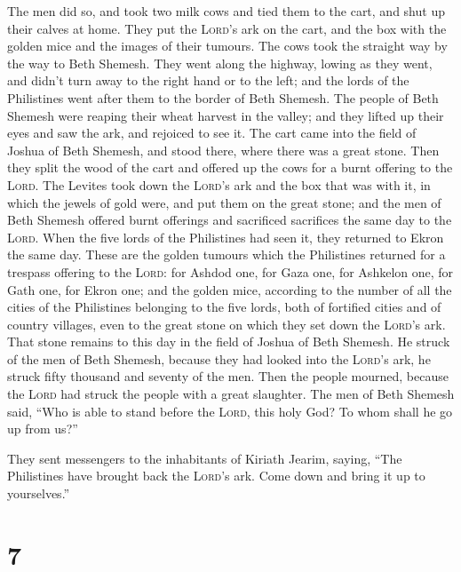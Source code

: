  The men did so, and took two milk cows and tied them to
the cart, and shut up their calves at home.  They put the
\textsc{Lord}'s ark on the cart, and the box with the golden mice and
the images of their tumours.  The cows took the straight
way by the way to Beth Shemesh. They went along the highway, lowing as
they went, and didn't turn away to the right hand or to the left; and
the lords of the Philistines went after them to the border of Beth
Shemesh.  The people of Beth Shemesh were reaping their
wheat harvest in the valley; and they lifted up their eyes and saw the
ark, and rejoiced to see it.  The cart came into the
field of Joshua of Beth Shemesh, and stood there, where there was a
great stone. Then they split the wood of the cart and offered up the
cows for a burnt offering to the \textsc{Lord}.  The
Levites took down the \textsc{Lord}'s ark and the box that was with it,
in which the jewels of gold were, and put them on the great stone; and
the men of Beth Shemesh offered burnt offerings and sacrificed
sacrifices the same day to the \textsc{Lord}.  When the
five lords of the Philistines had seen it, they returned to Ekron the
same day.  These are the golden tumours which the
Philistines returned for a trespass offering to the \textsc{Lord}: for
Ashdod one, for Gaza one, for Ashkelon one, for Gath one, for Ekron one;
 and the golden mice, according to the number of all the
cities of the Philistines belonging to the five lords, both of fortified
cities and of country villages, even to the great stone on which they
set down the \textsc{Lord}'s ark. That stone remains to this day in the
field of Joshua of Beth Shemesh.  He struck of the men of
Beth Shemesh, because they had looked into the \textsc{Lord}'s ark, he
struck fifty thousand and seventy of the men. Then the people mourned,
because the \textsc{Lord} had struck the people with a great slaughter.
 The men of Beth Shemesh said, ``Who is able to stand
before the \textsc{Lord}, this holy God? To whom shall he go up from
us?''

 They sent messengers to the inhabitants of Kiriath
Jearim, saying, ``The Philistines have brought back the \textsc{Lord}'s
ark. Come down and bring it up to yourselves.''

\hypertarget{section-6}{%
\section{7}\label{section-6}}

